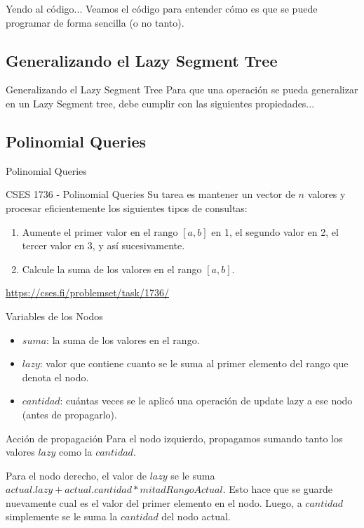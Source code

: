\documentclass{beamer}
\begin{document}
\begin{frame}{Yendo al código...}
Veamos el código para entender cómo es que se puede programar de forma sencilla (o no tanto).
\end{frame}

\subsection{Generalizando el Lazy Segment Tree}
\begin{frame}{Generalizando el Lazy Segment Tree}
Para que una operación se pueda generalizar en un Lazy Segment tree, debe cumplir con las siguientes propiedades...
\end{frame}

\subsection{Polinomial Queries}
\begin{frame}{Polinomial Queries}
\begin{block}{CSES 1736 - Polinomial Queries}
Su tarea es mantener un vector de $n$ valores y procesar eficientemente los siguientes tipos de consultas:
\begin{enumerate}
    \item Aumente el primer valor en el rango $[a,b]$ en 1, el segundo valor en 2, el tercer valor en 3, y así sucesivamente.
    \item Calcule la suma de los valores en el rango $[a,b]$.
\end{enumerate}
\end{block}

\url{https://cses.fi/problemset/task/1736/}
\end{frame}

\begin{frame}{Variables de los Nodos}
\begin{itemize}
    \item $suma$: la suma de los valores en el rango.
    \item $lazy$: valor que contiene cuanto se le suma al primer elemento del rango que denota el nodo.
    \item $cantidad$: cuántas veces se le aplicó una operación de update lazy a ese nodo (antes de propagarlo).
\end{itemize}  
\end{frame}
    
\begin{frame}{Acción de propagación}
Para el nodo izquierdo, propagamos sumando tanto los valores $lazy$ como la $cantidad$.

\pause
Para el nodo derecho, el valor de $lazy$ se le suma $actual.lazy+actual.cantidad * mitadRangoActual$. Esto hace que se guarde nuevamente cual es el valor del primer elemento en el nodo. Luego, a $cantidad$ simplemente se le suma la $cantidad$ del nodo actual.
\end{frame}
    
\end{document}
